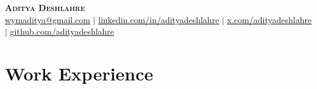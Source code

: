 \documentclass[letterpaper,11pt]{article}
\begin{document}

\begin{center}
    \textbf{\Huge \scshape Aditya Deshlahre} \\ \vspace{4pt}
    \small \href{mailto:wymaditya@gmail.com}{{wymaditya@gmail.com}} $|$ 
    \href{https://www.linkedin.com/in/adityadeshlahre/}{{\underline{linkedin.com/in/adityadeshlahre}}} $|$
    \href{https://x.com/adityadeshlahre}{{\underline{x.com/adityadeshlahre}}} $|$
    \href{https://github.com/adityadeshlahre}{{\underline{github.com/adityadeshlahre}}}
\end{center}


%


\section{Work Experience}
\end{document}
